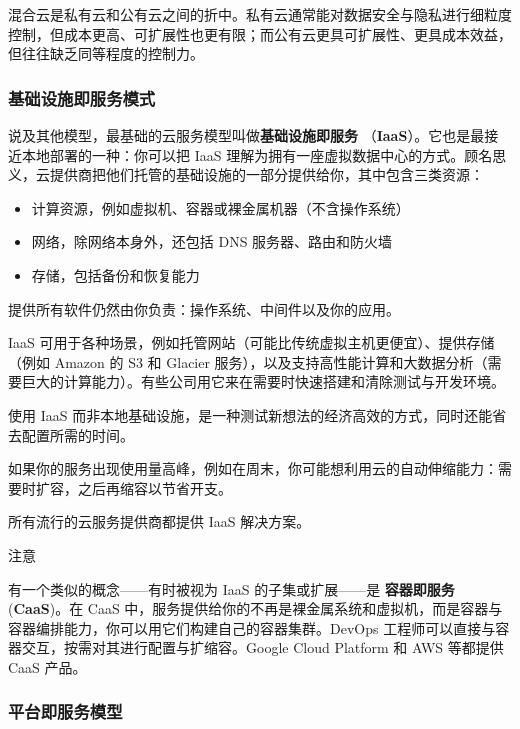 混合云是私有云和公有云之间的折中。私有云通常能对数据安全与隐私进行细粒度控制，但成本更高、可扩展性也更有限；而公有云更具可扩展性、更具成本效益，但往往缺乏同等程度的控制力。

\subsubsection{基础设施即服务模式}

\label{idx:267}
\label{idx:268}
\label{idx:269}
说及其他模型，最基础的云服务模型叫做\textbf{基础设施即服务 }（\textbf{IaaS}）。它也是最接近本地部署的一种：你可以把 IaaS 理解为拥有一座虚拟数据中心的方式。顾名思义，云提供商把他们托管的基础设施的一部分提供给你，其中包含三类资源：

\begin{itemize}
\item 计算资源，例如虚拟机、容器或裸金属机器（不含操作系统）
\item 网络，除网络本身外，还包括 DNS 服务器、路由和防火墙
\item 存储，包括备份和恢复能力
\end{itemize}

提供所有软件仍然由你负责：操作系统、中间件以及你的应用。

\label{idx:270}
IaaS 可用于各种场景，例如托管网站（可能比传统虚拟主机更便宜）、提供存储（例如 Amazon 的 S3 和 Glacier 服务），以及支持高性能计算和大数据分析（需要巨大的计算能力）。有些公司用它来在需要时快速搭建和清除测试与开发环境。

使用 IaaS 而非本地基础设施，是一种测试新想法的经济高效的方式，同时还能省去配置所需的时间。

如果你的服务出现使用量高峰，例如在周末，你可能想利用云的自动伸缩能力：需要时扩容，之后再缩容以节省开支。

所有流行的云服务提供商都提供 IaaS 解决方案。

\begin{myNotic}{注意}

\label{idx:271}
有一个类似的概念——有时被视为 IaaS 的子集或扩展——是 \textbf{容器即服务 }(\textbf{CaaS})。在 CaaS 中，服务提供给你的不再是裸金属系统和虚拟机，而是容器与容器编排能力，你可以用它们构建自己的容器集群。DevOps 工程师可以直接与容器交互，按需对其进行配置与扩缩容。Google Cloud Platform 和 AWS 等都提供 CaaS 产品。
\end{myNotic}

\subsubsection{平台即服务模型}

